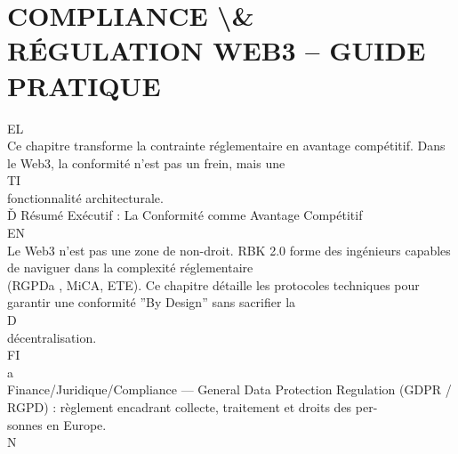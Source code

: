\documentclass[12pt,landscape,a4paper]{article}
\begin{document}
\section{COMPLIANCE \textbackslash{}& RÉGULATION WEB3 – GUIDE PRATIQUE}
\vspace{0.5em}
\vspace{0.5em}
\vspace{0.5em}
\vspace{0.5em}
EL\\
Ce chapitre transforme la contrainte réglementaire en avantage compétitif. Dans le Web3, la conformité n’est pas un frein, mais une\\
\vspace{0.5em}
\vspace{0.5em}
\vspace{0.5em}
\vspace{0.5em}
TI\\
fonctionnalité architecturale.\\
\vspace{0.5em}
Ď Résumé Exécutif : La Conformité comme Avantage Compétitif\\
\vspace{0.5em}
\vspace{0.5em}
\vspace{0.5em}
\vspace{0.5em}
EN\\
Le Web3 n’est pas une zone de non-droit. RBK 2.0 forme des ingénieurs capables de naviguer dans la complexité réglementaire\\
(RGPDa , MiCA, ETE). Ce chapitre détaille les protocoles techniques pour garantir une conformité ”By Design” sans sacrifier la\\
\vspace{0.5em}
\vspace{0.5em}
\vspace{0.5em}
\vspace{0.5em}
D\\
décentralisation.\\
\vspace{0.5em}
\vspace{0.5em}
\vspace{0.5em}
FI\\
a\\
Finance/Juridique/Compliance — General Data Protection Regulation (GDPR / RGPD) : règlement encadrant collecte, traitement et droits des per-\\
sonnes en Europe.\\
N\\
\end{document}
